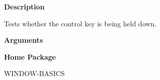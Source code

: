  
{\bf Description}

Tests whether the control key is being held down.

 
{\bf Arguments}


 
{\bf Home Package}

WINDOW-BASICS

